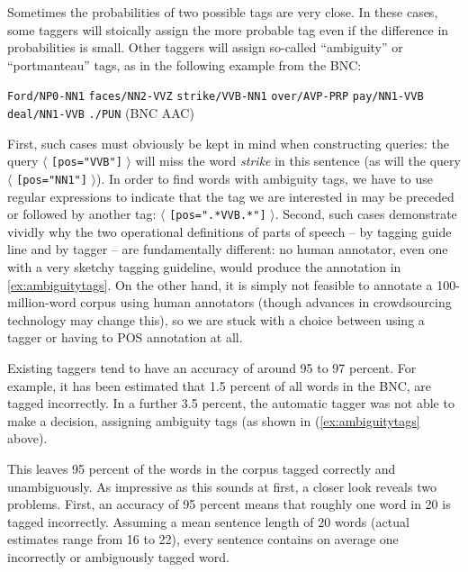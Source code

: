 Sometimes the probabilities of two possible tags are very close. In these cases, some taggers will stoically assign the more probable tag even if the difference in probabilities is small. Other taggers will assign so-called ``ambiguity'' or ``portmanteau'' tags, as in the following example from the BNC:

\begin{exe}
\ex \begin{minipage}[t]{0.85\textwidth} \raggedright \texttt{Ford/NP0-NN1} \texttt{faces/NN2-VVZ} \texttt{strike/VVB-NN1} \texttt{over/AVP-PRP} \texttt{pay/NN1-VVB} \texttt{deal/NN1-VVB} \texttt{./PUN} (BNC AAC) \end{minipage}
\label{ex:ambiguitytags}
\end{exe}


First, such cases must obviously be kept in mind when constructing queries: the query $\langle$ \texttt{[pos="VVB"]} $\rangle$ will miss the word \textit{strike} in this sentence (as will the query $\langle$ \texttt{[pos="NN1"]} $\rangle$). In order to find words with ambiguity tags, we have to use regular expressions to indicate that the tag we are interested in may be preceded or followed by another tag: $\langle$ \texttt{[pos=".*VVB.*"]} $\rangle$. Second, such cases demonstrate vividly why the two operational definitions of parts of speech -- by tagging guide line and by tagger -- are fundamentally different: no human annotator, even one with a very sketchy tagging guideline, would produce the annotation in \ref{ex:ambiguitytags}. On the other hand, it is simply not feasible to annotate a 100-million-word corpus using human annotators (though advances in crowdsourcing technology may change this), so we are stuck with a choice between using a tagger or having to POS annotation at all.

Existing taggers tend to have an accuracy of around 95 to 97 percent. For example, it has been estimated \citep{leech_claws4:_1994} that 1.5 percent of all words in the BNC, are tagged incorrectly. In a further 3.5 percent, the automatic tagger was not able to make a decision, assigning ambiguity tags (as shown in (\ref{ex:ambiguitytags} above).

This leaves 95 percent of the words in the corpus tagged correctly and unambiguously. As impressive as this sounds at first, a closer look reveals two problems. First, an accuracy of 95 percent means that roughly one word in 20 is tagged incorrectly. Assuming a mean sentence length of 20 words (actual estimates range from 16 to 22), every sentence contains on average one incorrectly or ambiguously tagged word.

